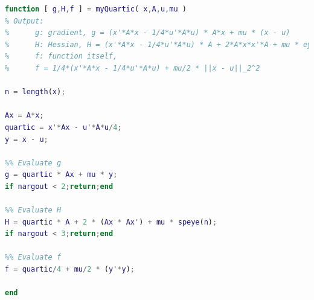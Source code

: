\begin{lstlisting}[language=matlab]
function [ g,H,f ] = myQuartic( x,A,u,mu )
% Output:
%      g: gradient, g = (x'*A*x - 1/4*u'*A*u) * A*x + mu * (x - u)
%      H: Hessian, H = (x'*A*x - 1/4*u'*A*u) * A + 2*A*x*x'*A + mu * eye(n)
%      f: function itself, 
%      f = 1/4*(x'*A*x - 1/4*u'*A*u) + mu/2 * ||x - u||_2^2

n = length(x);

Ax = A*x;
quartic = x'*Ax - u'*A*u/4;
y = x - u;

%% Evaluate g
g = quartic * Ax + mu * y;
if nargout < 2;return;end

%% Evaluate H
H = quartic * A + 2 * (Ax * Ax') + mu * speye(n);
if nargout < 3;return;end

%% Evaluate f
f = quartic/4 + mu/2 * (y'*y);

end
\end{lstlisting}
